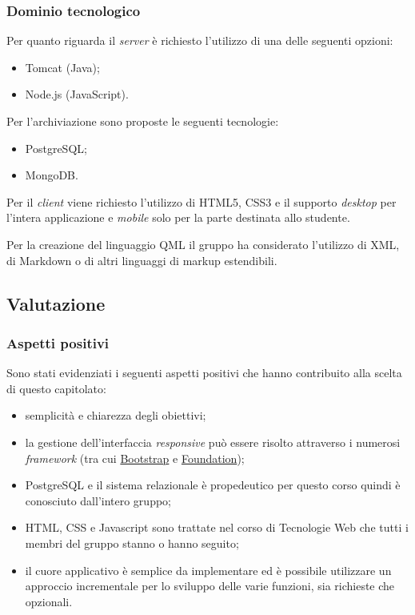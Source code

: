 \documentclass[12pt,a4paper]{article}
\begin{document}
\subsubsection{Dominio tecnologico}

Per quanto riguarda il \textit{server} è richiesto l'utilizzo di una delle seguenti opzioni:

\begin{itemize}
\item Tomcat (Java);
\item Node.js (JavaScript).
\end{itemize}
Per l'archiviazione sono proposte le seguenti tecnologie:
\begin{itemize}
\item PostgreSQL;
\item MongoDB.
\end{itemize}
Per il \textit{client} viene richiesto l'utilizzo di HTML5, CSS3 e il supporto \textit{desktop} per l'intera applicazione e \textit{mobile} solo per la parte destinata allo studente.

Per la creazione del linguaggio QML il gruppo ha considerato l'utilizzo di XML, di Markdown o di altri linguaggi di markup estendibili.

\subsection{Valutazione}
\subsubsection{Aspetti positivi}

Sono stati evidenziati i seguenti aspetti positivi che hanno contribuito alla scelta di questo capitolato:

\begin{itemize}
\item semplicità e chiarezza degli obiettivi;
\item la gestione dell'interfaccia \textit{responsive} può essere risolto attraverso i numerosi \textit{framework} (tra cui \href{http://getbootstrap.com}{Bootstrap} e \href{http://foundation.zurb.com}{Foundation});
\item PostgreSQL e il sistema relazionale è propedeutico per questo corso quindi è conosciuto dall'intero gruppo;
\item HTML, CSS e Javascript sono trattate nel corso di Tecnologie Web che tutti i membri del gruppo stanno o hanno
seguito;
\item il cuore applicativo è semplice da implementare ed è possibile utilizzare un approccio incrementale
per lo sviluppo delle varie funzioni, sia richieste che opzionali.
\end{itemize}
\end{document}
